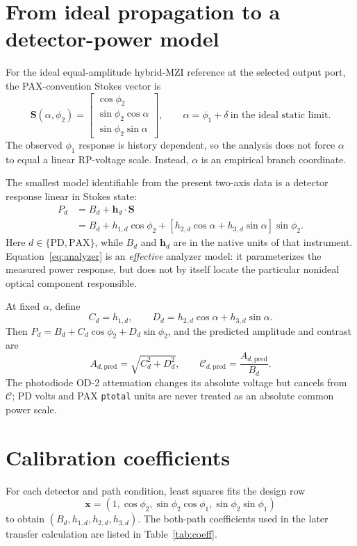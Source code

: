 \documentclass[10pt]{article}
\newcommand{\PD}{\mathrm{PD}}
\newcommand{\PAX}{\mathrm{PAX}}
\begin{document}
\section{From ideal propagation to a detector-power model}
For the ideal equal-amplitude hybrid-MZI reference at the selected output port,
the PAX-convention Stokes vector is
\begin{equation}
\mathbf{S}(\alpha,\phi_2)=
\begin{bmatrix}
\cos\phi_2\\
\sin\phi_2\cos\alpha\\
\sin\phi_2\sin\alpha
\end{bmatrix},
\qquad \alpha=\phi_1+\delta\ \text{in the ideal static limit}.
\label{eq:stokes}
\end{equation}
The observed $\phi_1$ response is history dependent, so the analysis does not
force $\alpha$ to equal a linear RP-voltage scale. Instead, $\alpha$ is an
empirical branch coordinate.

The smallest model identifiable from the present two-axis data is a detector
response linear in Stokes state:
\begin{align}
P_d &= B_d+\mathbf{h}_d\cdot\mathbf{S}\\
&=B_d+h_{1,d}\cos\phi_2+
\left[h_{2,d}\cos\alpha+h_{3,d}\sin\alpha\right]\sin\phi_2.
\label{eq:analyzer}
\end{align}
Here $d\in\{\PD,\PAX\}$, while $B_d$ and $\mathbf{h}_d$ are in the native
units of that instrument. Equation~\eqref{eq:analyzer} is an \emph{effective}
analyzer model: it parameterizes the measured power response, but does not by
itself locate the particular nonideal optical component responsible.

At fixed $\alpha$, define
\begin{equation}
C_d=h_{1,d},\qquad
D_d=h_{2,d}\cos\alpha+h_{3,d}\sin\alpha.
\end{equation}
Then $P_d=B_d+C_d\cos\phi_2+D_d\sin\phi_2$, and the predicted amplitude and
contrast are
\begin{equation}
A_{d,\mathrm{pred}}=\sqrt{C_d^2+D_d^2},\qquad
\mathcal{C}_{d,\mathrm{pred}}=\frac{A_{d,\mathrm{pred}}}{B_d}.
\label{eq:contrast}
\end{equation}
The photodiode OD-2 attenuation changes its absolute voltage but cancels from
$\mathcal{C}$; PD volts and PAX \texttt{ptotal} units are never treated as an
absolute common power scale.

\section{Calibration coefficients}
For each detector and path condition, least squares fits the design row
\begin{equation}
\mathbf{x}=\left(1,\cos\phi_2,\sin\phi_2\cos\phi_1,
\sin\phi_2\sin\phi_1\right)
\end{equation}
to obtain $(B_d,h_{1,d},h_{2,d},h_{3,d})$. The both-path coefficients used in
the later transfer calculation are listed in Table~\ref{tab:coeff}.
\end{document}
